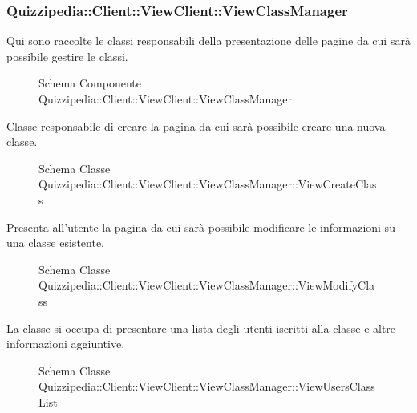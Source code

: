\subsubsection{Quizzipedia::Client::ViewClient::ViewClassManager}
Qui sono raccolte le classi responsabili della presentazione delle pagine da cui sarà possibile gestire le classi.
\begin{figure}[H]
\centering
\noindent{}
\caption{Schema Componente Quizzipedia::Client::ViewClient::ViewClassManager}
\end{figure}
Classe responsabile di creare la pagina da cui sarà possibile creare una nuova classe.
\begin{figure}[H]
\centering
\noindent{}
\caption{Schema Classe Quizzipedia::Client::ViewClient::ViewClassManager::ViewCreateClass}
\end{figure}
Presenta all'utente la pagina da cui sarà possibile modificare le informazioni su una classe esistente.
\begin{figure}[H]
\centering
\noindent{}
\caption{Schema Classe Quizzipedia::Client::ViewClient::ViewClassManager::ViewModifyClass}
\end{figure}
La classe si occupa di presentare una lista degli utenti iscritti alla classe e altre informazioni aggiuntive.
\begin{figure}[H]
\centering
\noindent{}
\caption{Schema Classe Quizzipedia::Client::ViewClient::ViewClassManager::ViewUsersClassList}
\end{figure}
